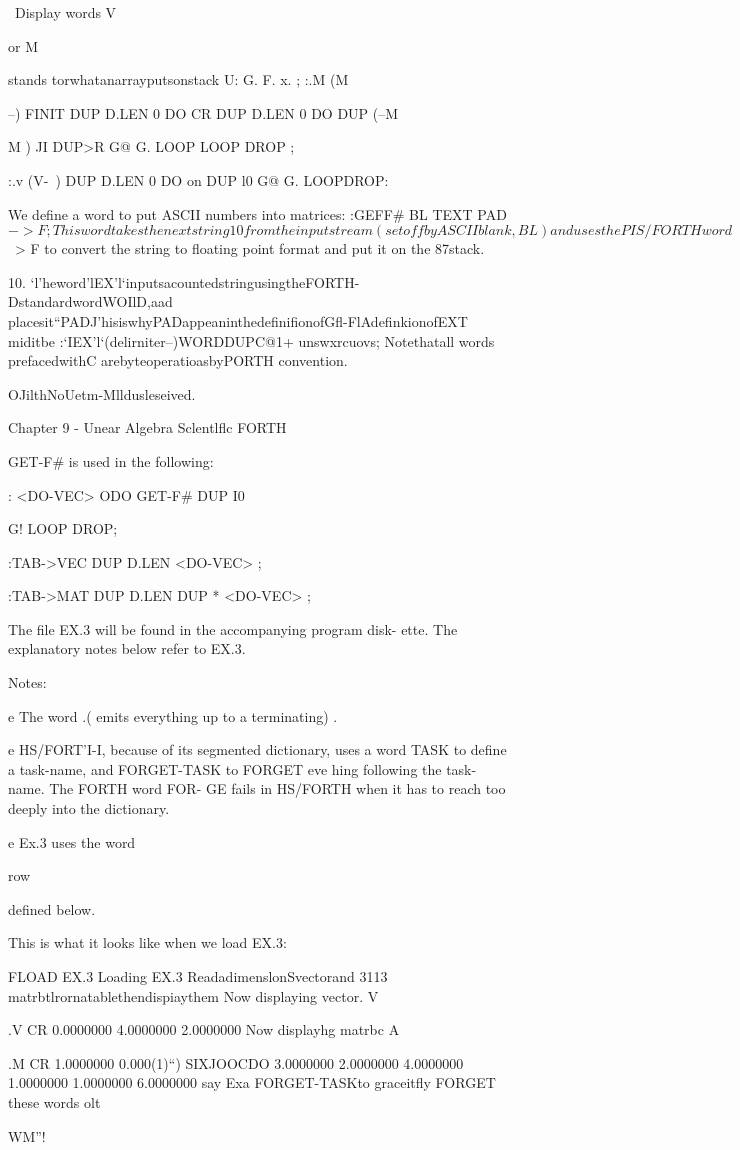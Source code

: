 \ Display words
V{ or M{{ stands torwhatanarrayputsonstack
U: G. F. x. ;
:.M (M{{--) FINIT DUP
D.LEN 0 DO CR DUP
D.LEN 0 DO DUP (--M{{ M{{ )
J}{I}} DUP>R G@ G.
LOOP
LOOP DROP ;

:.v (V{-~) DUP D.LEN
0 DO on DUP l}{0} G@ G. LOOPDROP:

We deﬁne a word to put ASCII numbers into matrices:
:GEFF# BL TEXT PAD $->F;

This word takes the next string10 from the input stream (set off
by ASCII blank, BL) and uses the PIS/FORTH word $~> F to
convert the string to ﬂoating point format and put it on the
87stack.

 

10. ‘l'heword'lEX'l‘inputsacountedstringusingtheFORTH-DstandardwordWOIlD,aad
placesit“PADJ'hisiswhyPADappeaninthedeﬁniﬁonofGﬂ-FlAdeﬁnkionofEXT
miditbe :‘IEX'l‘(delirniter--)WORDDUPC@1+ unswxrcuovs; Notethatall
words prefacedwithC arebyteoperatioasbyPORTH convention.

OJilthNoUetm-Mlldusleseived.

Chapter 9 - Unear Algebra Sclentlﬂc FORTH

GET-F# is used in the following:

: <DO-VEC> ODO GET-F# DUP I0} G!
LOOP DROP;

:TAB->VEC DUP D.LEN <DO-VEC> ;

:TAB->MAT DUP D.LEN DUP * <DO-VEC> ;

The ﬁle EX.3 will be found in the accompanying program disk-
ette. The explanatory notes below refer to EX.3.

Notes:

e The word .( emits everything up to a terminating) .

e HS/FORT'I-I, because of its segmented dictionary, uses a word
TASK to deﬁne a task-name, and FORGET-TASK to FORGET
eve hing following the task-name. The FORTH word FOR-
GE fails in HS/FORTH when it has to reach too deeply into
the dictionary.

e Ex.3 uses the word }row{ deﬁned below.

This is what it looks like when we load EX.3:

FLOAD EX.3 Loading EX.3
ReadadimenslonSvectorand 3113 matrbtlrornatablethendispiaythem
Now displaying vector.
V{ .V CR
0.0000000
4.0000000
2.0000000
Now displayhg matrbc
A{{ .M CR
1.0000000 0.000(1)“) SIXJOOCDO
3.0000000 2.0000000 4.0000000
1.0000000 1.0000000 6.0000000
say Exa FORGET-TASKto graceitﬂy FORGET these words olt

WM”!

}}}}}}}}}
